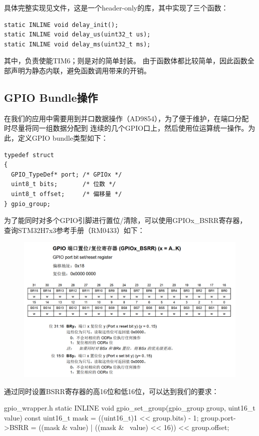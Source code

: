 具体完整实现见文件，这是一个header-only的库，其中实现了三个函数：

\begin{verbatim}
static INLINE void delay_init();
static INLINE void delay_us(uint32_t us);
static INLINE void delay_ms(uint32_t ms);
\end{verbatim}

其中，负责使能TIM6；则是对的简单封装。
由于函数体都比较简单，因此函数全部声明为静态内联，避免函数调用带来的开销。

\subsection{GPIO Bundle操作}
在我们的应用中需要用到并口数据操作（AD9854），为了便于维护，在端口分配时尽量将同一组数据分配到
连续的几个GPIO口上，然后使用位运算统一操作。为此，定义GPIO bundle类型如下：

\begin{verbatim}
typedef struct
{
  GPIO_TypeDef* port; /* GPIOx */
  uint8_t bits;       /* 位数 */
  uint8_t offset;     /* 偏移量 */
} gpio_group;
\end{verbatim}

为了能同时对多个GPIO引脚进行置位/清除，可以使用GPIOx\_BSRR寄存器，
查询STM32H7x3参考手册（RM0433）如下：

\begin{figure}[H]
\center
    \includegraphics[width=\textwidth]{img/bsrr.png}
\end{figure}

通过同时设置BSRR寄存器的高16位和低16位，可以达到我们的要求：

\begin{cbox}{gpio\_wrapper.h}
static INLINE void
gpio_set_group(gpio_group group, uint16_t value)
{
  const uint16_t mask = ((uint16_t)1 << group.bits) - 1;
  group.port->BSRR = ((mask & value) | ((mask & ~value) << 16)) << group.offset;
}
\end{cbox}

